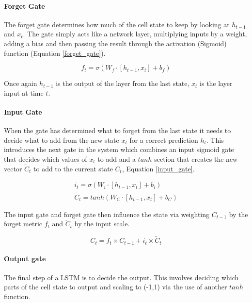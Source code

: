 \documentclass[11pt,twoside]{report}
\begin{document}
\paragraph{Forget Gate}
The forget gate determines how much of the cell state to keep by looking at $h_{t-1}$ and $x_{t}$. The gate simply acts like a network layer, multiplying inputs by a weight, adding a bias and then passing the result through the activation (Sigmoid) function (Equation \ref{forget_gate}). 

\begin{equation}
\label{forget_gate}
f_{t} = \sigma (W_{f} \cdot [h_{t-1},x_{t}] + b_{f})
\end{equation}

Once again $h_{t-1}$ is the output of the layer from the last state, $x_{t}$ is the layer input at time $t$.

\paragraph{Input Gate} When the gate has determined what to forget from the last state it needs to decide what to add from the new state $x_{t}$ for a correct prediction $h_{t}$. This introduces the next gate in the system which combines an input sigmoid gate that decides which values of $x_{t}$ to add and a $tanh$ section that creates the new vector $\tilde{C}_{t}$ to add to the current state $C_{t}$, Equation \ref{input_gate}.


\begin{equation}
\begin{aligned}
\mathit{i}_{t} = \sigma (W_{i} \cdot [h_{t-1},x_{t}] + b_{i}) \\
\tilde{C}_{t} = tanh(W_{C} \cdot [h_{t-1},x_{t}] + b_{C})
\end{aligned}
\label{input_gate}
\end{equation}

The input gate and forget gate then influence the state via weighting $C_{t-1}$ by the forget metric $f_{t}$ and $\tilde{C}_{t}$ by the input scale.

\begin{equation}
C_{t} = f_{t} \times C_{t-1} + i_{t} \times \tilde{C}_{t}
\label{forget_gate}
\end{equation}

\paragraph{Output gate} The final step of a LSTM is to decide the output. This involves deciding which parts of the cell state to output and scaling to (-1,1) via the use of another $tanh$ function.
\end{document}

